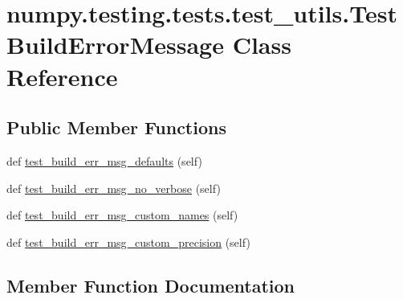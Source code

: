 \hypertarget{classnumpy_1_1testing_1_1tests_1_1test__utils_1_1TestBuildErrorMessage}{}\section{numpy.\+testing.\+tests.\+test\+\_\+utils.\+Test\+Build\+Error\+Message Class Reference}
\label{classnumpy_1_1testing_1_1tests_1_1test__utils_1_1TestBuildErrorMessage}
\subsection*{Public Member Functions}
\begin{DoxyCompactItemize}
\item 
def \hyperlink{classnumpy_1_1testing_1_1tests_1_1test__utils_1_1TestBuildErrorMessage_a8ebe91eaafe74b1e1845821fd9e18559}{test\+\_\+build\+\_\+err\+\_\+msg\+\_\+defaults} (self)
\item 
def \hyperlink{classnumpy_1_1testing_1_1tests_1_1test__utils_1_1TestBuildErrorMessage_a29400bbc273dea253edb3f0ee9fd030c}{test\+\_\+build\+\_\+err\+\_\+msg\+\_\+no\+\_\+verbose} (self)
\item 
def \hyperlink{classnumpy_1_1testing_1_1tests_1_1test__utils_1_1TestBuildErrorMessage_a422c5348443d165ba4c0b80bf542b7fe}{test\+\_\+build\+\_\+err\+\_\+msg\+\_\+custom\+\_\+names} (self)
\item 
def \hyperlink{classnumpy_1_1testing_1_1tests_1_1test__utils_1_1TestBuildErrorMessage_a706c4441f169c1b264f61151b3101da2}{test\+\_\+build\+\_\+err\+\_\+msg\+\_\+custom\+\_\+precision} (self)
\end{DoxyCompactItemize}


\subsection{Member Function Documentation}
\mbox{\label{classnumpy_1_1testing_1_1tests_1_1test__utils_1_1TestBuildErrorMessage_a422c5348443d165ba4c0b80bf542b7fe}} 
